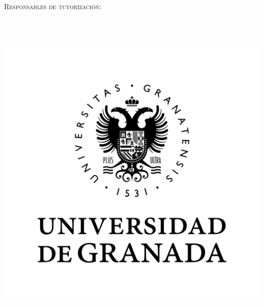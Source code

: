 \begin{titlepage}
    \begin{addmargin}[-1cm]{-1cm}
    \begin{center}
        \large

        \hfill

        \vfill


        {\centering\bfseries\LARGE \myTitle \par}
        \medskip

        \myName\\\bigskip

        \small
		
		{\scshape Responsables de tutorización: \par}
         
        \myProf \\[5pt]
        \myOtherProf \\ \bigskip


        \includegraphics[scale = 0.5, angle = 0]{imgs/ugr.png} \\ \medskip


\end{center}
\end{addmargin}
\end{titlepage}
